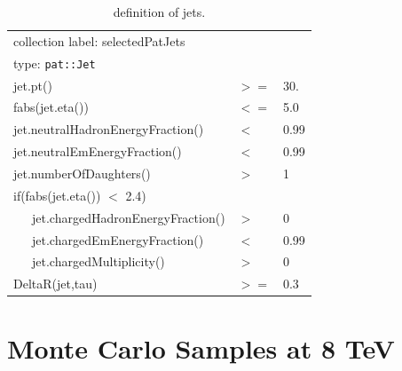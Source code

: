 \begin{table}[htb]
	\caption{definition of jets.}
	\label{table:jetobjdefinition_13TeV}
	\begin{center}
		\ttfamily\scriptsize\selectfont
		\begin{tabular}{|l|ll|}
			\hline
			\multicolumn{3}{|l|}{ collection label: selectedPatJets}\\
			\multicolumn{3}{|l|}{ type: \texttt{pat::Jet}}\\
			\hline
			jet.pt() & $>=$ & 30. \\
			fabs(jet.eta()) & $<=$ & 5.0 \\
			jet.neutralHadronEnergyFraction() & $<$ &  0.99 \\
			jet.neutralEmEnergyFraction() & $<$ & 0.99 \\
			jet.numberOfDaughters() & $>$& 1 \\
			if(fabs(jet.eta()) $<$ 2.4) && \\
			~~~jet.chargedHadronEnergyFraction() & $>$ & 0 \\
			~~~jet.chargedEmEnergyFraction() & $<$ & 0.99 \\
			~~~jet.chargedMultiplicity() & $>$ & 0 \\
			DeltaR(jet,tau) & $>=$ & 0.3 \\
			\hline
		\end{tabular}
	\end{center}
\end{table}

\section{Monte Carlo Samples at 8 TeV}

